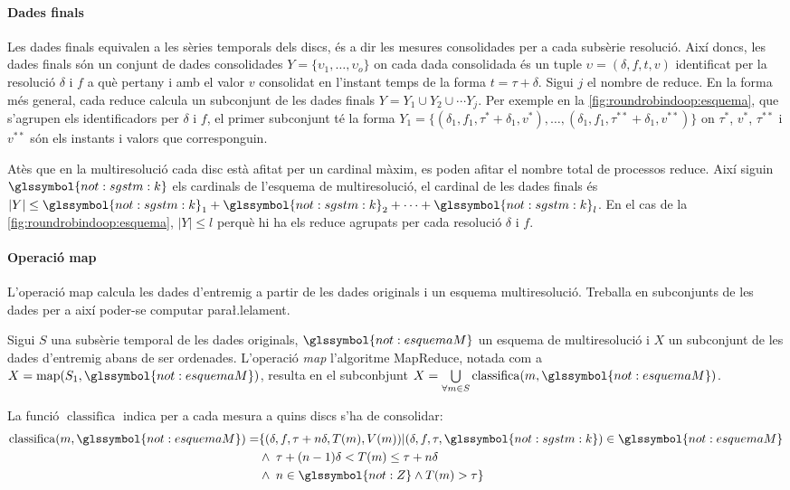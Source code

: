 \paragraph{Dades finals}
Les dades finals equivalen a les sèries temporals dels discs, és a dir
les mesures consolidades per a cada subsèrie resolució. Així doncs,
les dades finals són un conjunt de dades consolidades $Y=\{
\upsilon_{1}, \dotsc, \upsilon_o\}$ on cada dada consolidada és un
tuple $\upsilon=(\delta,f,t,v)$ identificat per la resolució $\delta$
i $f$ a què pertany i amb el valor $v$ consolidat en l'instant temps de la
forma $t=\tau+\delta$.  Sigui $j$ el nombre de reduce.  En la forma més
general, cada reduce calcula un subconjunt de les dades finals
$Y=Y_1\cup Y_2 \cup \dotsb Y_j$.  Per exemple en la
\autoref{fig:roundrobindoop:esquema}, que s'agrupen els identificadors
per $\delta$ i $f$, el primer subconjunt té la forma $Y_1 = \{
(\delta_1,f_1,\tau^*+\delta_1,v^*), \dotsc
,(\delta_1,f_1,\tau^{**}+\delta_1,v^{**}) \}$ on $\tau^*$, $v^*$, $\tau^{**}$ i
$v^{**}$ són els instants i valors que corresponguin.
 
Atès que en la multiresolució cada disc està afitat per un cardinal
màxim, es poden afitar el nombre total de processos reduce.  Així
siguin $\glssymbol{not:sgstm:k}$ els cardinals de l'esquema de
multiresolució, el cardinal de les dades finals és $|Y|\leq
\glssymbol{not:sgstm:k}_1 + \glssymbol{not:sgstm:k}_2 + \dotsb +
\glssymbol{not:sgstm:k}_l$. En el cas de la
\autoref{fig:roundrobindoop:esquema}, $|Y|\leq l$ perquè hi ha els
reduce agrupats per cada resolució $\delta$ i $f$.




\paragraph{Operació map}
L'operació map calcula les dades d'entremig a partir de les dades
originals i un esquema multiresolució. Treballa en subconjunts de les
dades per a així poder-se computar para\l.lelament.
\begin{definition}
  Sigui $S$ una subsèrie temporal de les dades originals,
  $\glssymbol{not:esquemaM}$ un esquema de multiresolució i $X$ un
  subconjunt de les dades d'entremig abans de ser
  ordenades. L'operació \emph{map} l'algoritme MapReduce,
  notada com a $X=\operatorname{map}(S_1,\glssymbol{not:esquemaM})$,
  resulta en el subconbjunt $X=
  \bigcup\limits_{ \forall m \in S}
  \operatorname{classifica}(m,\glssymbol{not:esquemaM})$.


  La funció $\operatorname{classifica}$ indica per a cada mesura a
  quins discs s'ha de consolidar:
  \begin{align*}\operatorname{classifica}(m,\glssymbol{not:esquemaM})= &\{
    (\delta,f,\tau+n\delta,T(m),V(m)) |
    (\delta,f,\tau,\glssymbol{not:sgstm:k}) \in \glssymbol{not:esquemaM} \\
    &\wedge\; \tau+(n-1)\delta < T(m) \leq \tau+n\delta \\
    &\wedge\; n\in\glssymbol{not:Z} \wedge T(m) > \tau \}
  \end{align*} 
\end{definition}

